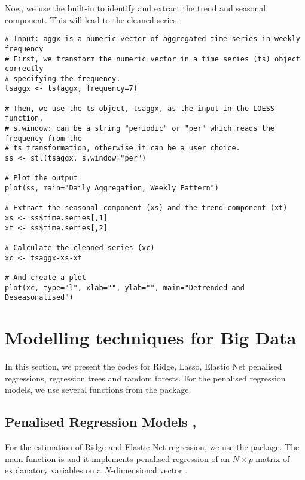 \documentclass[12pt]{article}
\begin{document}
Now, we use the built-in  to identify and extract the trend and
seasonal component. This will lead to the cleaned series.
\begin{lstlisting}[title=\textbf{Seasonal decomposition of time series by Loess.}]
# Input: aggx is a numeric vector of aggregated time series in weekly frequency
# First, we transform the numeric vector in a time series (ts) object correctly
# specifying the frequency.
tsaggx <- ts(aggx, frequency=7)

# Then, we use the ts object, tsaggx, as the input in the LOESS function.
# s.window: can be a string "periodic" or "per" which reads the frequency from the
# ts transformation, otherwise it can be a user choice.
ss <- stl(tsaggx, s.window="per")

# Plot the output
plot(ss, main="Daily Aggregation, Weekly Pattern")

# Extract the seasonal component (xs) and the trend component (xt)
xs <- ss$time.series[,1]
xt <- ss$time.series[,2]

# Calculate the cleaned series (xc)
xc <- tsaggx-xs-xt

# And create a plot
plot(xc, type="l", xlab="", ylab="", main="Detrended and Deseasonalised")
\end{lstlisting}

\section{Modelling techniques for Big Data}

In this section, we present the codes for Ridge, Lasso, Elastic Net penalised regressions, regression trees and random forests. For the penalised regression models, we use several functions from the  package.

\subsection{Penalised Regression Models \textendash{} {\href{https://github.com/eurostat/econowcast/blob/master/model/Ridge.R}{}}, {\href{https://github.com/eurostat/econowcast/blob/master/model/ElasticNet.R}{}}}

For the estimation of Ridge and Elastic Net regression, we use the  package. The main function is  and it implements penalised regression of an $N \times p$ matrix of explanatory variables  on a $N$-dimensional vector .
\end{document}

